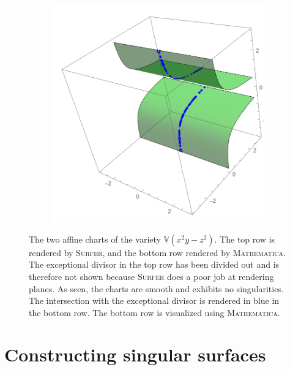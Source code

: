 \documentclass{article}
\newcommand{\V}{\ensuremath{\mathbb{V}}}
\begin{document}
\begin{example}
\begin{figure}[h!]
\begin{subfigure}[t]{0.3\textwidth}
            \end{subfigure}
            ~
            \begin{subfigure}[t]{0.3\textwidth}
                \includegraphics[width=\textwidth]{pictures/affine_2_exceptional.pdf} 
            \end{subfigure}
            \caption{The two affine charts of the variety $\V(x^2y-z^2)$. The
                top row is rendered by \textsc{Surfer}, and the bottom row
                rendered by \textsc{Mathematica.} The exceptional divisor in
                the top row has been divided out and is therefore not shown
                because \textsc{Surfer} does a poor job at rendering planes. As
                seen, the charts are smooth and exhibits no singularities. The
                intersection with the exceptional divisor is rendered in blue
                in the bottom row. The bottom row is visualized using
            \textsc{Mathematica}.}
            \label{fig:affine_line}
        \end{figure}
    \end{example}
    
    \section{Constructing singular surfaces}
    \label{sec:constructing_singular_surfaces}
    
\end{document}
